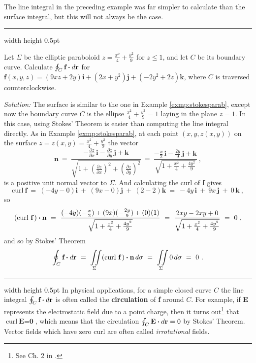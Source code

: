The line integral in the preceding example was far simpler to calculate than the surface integral, but this will not
always be the case.

\vspace{3mm}
\hrule width \textwidth height 0.5pt
\begin{exmp}
 Let $\Sigma$ be the elliptic paraboloid $z=\frac{x^2}{4}+\frac{y^2}{9}$ for $z \le 1$, and let $C$ be its boundary
 curve.
 Calculate $\oint_{C} \textbf{f} \bm{\cdot} d\textbf{r}$ for $\textbf{f}(x,y,z)=(9xz+2y)\textbf{i}+(2x+y^2 )\textbf{j}+(-2y^2 +2z)\textbf{k}$,
 where $C$ is traversed counterclockwise.\vspace{1mm}
 \par\noindent\emph{Solution:} The surface is similar to the one in Example \ref{exmp:stokesparab}, except now the
 boundary curve $C$ is the ellipse $\frac{x^2}{4}+\frac{y^2}{9}=1$ laying in the plane $z=1$. 
 In this case, using Stokes' Theorem is easier than computing the line integral directly. 
 As in Example \ref{exmp:stokesparab}, at each
 point $(x,y,z(x,y))$ on the surface $z=z(x,y)=\frac{x^2}{4}+\frac{y^2}{9}$ the vector
 \begin{displaymath}
  \textbf{n} ~=~
   \frac{-\frac{\partial z}{\partial x}\,\textbf{i} - \frac{\partial z}{\partial y}\,\textbf{j} +
   \textbf{k}}{\sqrt{1 + \left( \tfrac{\partial z}{\partial x} \right)^2 +
   \left( \tfrac{\partial z}{\partial y} \right)^2}} ~=~
   \frac{-\tfrac{x}{2}\,\textbf{i} - \tfrac{2y}{9}\,\textbf{j} + \textbf{k}}{\sqrt{1 +\tfrac{x^2}{4}+
    \tfrac{4y^2}{9}}} ~,
 \end{displaymath}
 is a positive unit normal vector to $\Sigma$. And calculating the curl of \textbf{f} gives
 \begin{displaymath}
  \text{curl}~\textbf{f} ~=~ (-4y-0)\textbf{i} ~+~ (9x-0)\textbf{j} ~+~ (2-2)\textbf{k} ~=~ -4y\,\textbf{i} ~+~ 9x\,\textbf{j} ~+~
   0\,\textbf{k}~,
 \end{displaymath}
 so
 \begin{displaymath}
  (\text{curl}~{\textbf{f}}\,) \bm{\cdot} \textbf{n} ~=~ \frac{(-4y)(-\tfrac{x}{2})+(9x)(-\tfrac{2y}{9})+
   (0)(1)}{\sqrt{1 +\tfrac{x^2}{4}+\tfrac{4y^2}{9}}} ~=~ \frac{2xy-2xy+0}{\sqrt{1 +\tfrac{x^2}{4}+\tfrac{4y^2}{9}}} ~=~ 0~,
 \end{displaymath}
 and so by Stokes' Theorem
 \begin{displaymath}
  \oint_{C} \textbf{f} \bm{\cdot} d\textbf{r} ~=~ \iint\limits_{\Sigma} (\text{curl}~{\textbf{f}}\,) \bm{\cdot} \textbf{n}\,d\sigma ~=~
   \iint\limits_{\Sigma} 0\,d\sigma ~=~ 0 ~.
 \end{displaymath}
\end{exmp}
\hrule width \textwidth height 0.5pt
\newpage
In physical applications, for a simple closed curve $C$ the line integral $\oint_{C} \textbf{f} \bm{\cdot} d\textbf{r}$
is often called the \textbf{circulation} of \textbf{f} around $C$. For example, if \textbf{E}
represents the electrostatic field due to a point charge, then
it turns out\footnote{See Ch. 2 in \cite{rmc}.} that $\text{curl}~\textbf{E} = \textbf{0}$, which means that the
circulation $\oint_{C} \textbf{E} \bm{\cdot} d\textbf{r}=0$ by Stokes' Theorem. Vector fields which have zero curl are often called
\emph{irrotational} fields.


